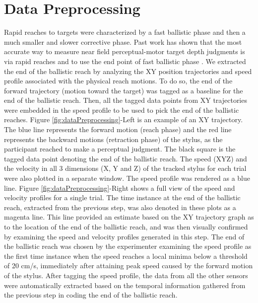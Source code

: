 
\section{Data Preprocessing}\label{dataPreprocessing}

Rapid reaches to targets were characterized by a fast ballistic phase and then a much smaller and slower corrective phase. Past work has shown that the most accurate way to measure near field perceptual-motor target depth judgments is via rapid reaches and to use the end point of fast ballistic phase \cite{BP98}. We extracted the end of the ballistic reach by analyzing the XY position trajectories and speed profile associated with the physical reach motions. To do so, the end of the forward trajectory (motion toward the target) was tagged as a baseline for the end of the ballistic reach. Then, all the tagged data points from XY trajectories were embedded in the speed profile to be used to pick the end of the ballistic reaches. Figure \ref{fig:dataPreprocessing}-Left is an example of an XY trajectory. The blue line represents the forward motion (reach phase) and the red line represents the backward motions (retraction phase) of the stylus, as the participant reached to make a perceptual judgment. The black square is the tagged data point denoting the end of the ballistic reach. The speed (XYZ) and the velocity in all 3 dimensions (X, Y and Z) of the tracked stylus for each trial were also plotted in a separate window. The speed profile was rendered as a blue line. Figure \ref{fig:dataPreprocessing}-Right shows a full view of the speed and velocity profiles for a single trial. The time instance at the end of the ballistic reach, extracted from the previous step, was also denoted in these plots as a magenta line. This line provided an estimate based on the XY trajectory graph as to the location of the end of the ballistic reach, and was then visually confirmed by examining the speed and velocity profiles generated in this step. The end of the ballistic reach was chosen by the experimenter examining the speed profile as the first time instance when the speed reaches a local minima below a threshold of 20 cm/s, immediately after attaining peak speed caused by the forward motion of the stylus. After tagging the speed profile, the data from all the other sensors were automatically extracted based on the temporal information gathered from the previous step in coding the end of the ballistic reach.


